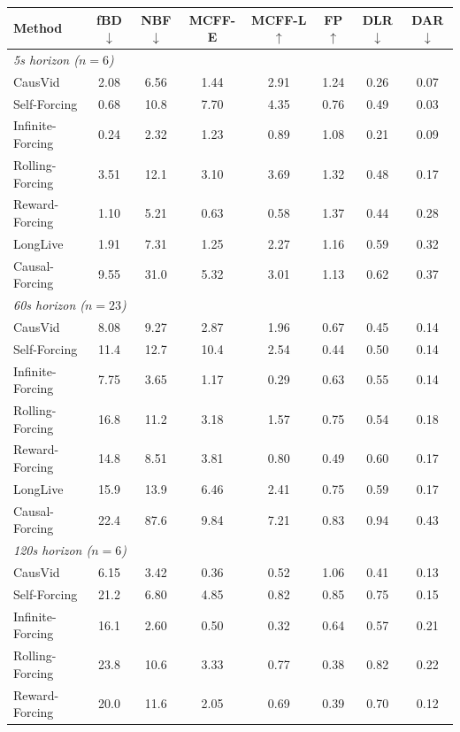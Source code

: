\begin{table}[!tb]
\centering
\small
\setlength{\tabcolsep}{4pt}
\begin{tabular}{lccccccc}
\toprule
Method & fBD$\downarrow$ & NBF$\downarrow$ & MCFF-E & MCFF-L$\uparrow$ & FP$\uparrow$ & DLR$\downarrow$ & DAR$\downarrow$ \\
\midrule
\multicolumn{8}{l}{\textit{5s horizon  ($n=6$)}} \\
CausVid & 2.08 & 6.56 & 1.44 & 2.91 & 1.24 & 0.26 & 0.07 \\
Self-Forcing & 0.68 & 10.8 & 7.70 & 4.35 & 0.76 & 0.49 & 0.03 \\
Infinite-Forcing & 0.24 & 2.32 & 1.23 & 0.89 & 1.08 & 0.21 & 0.09 \\
Rolling-Forcing & 3.51 & 12.1 & 3.10 & 3.69 & 1.32 & 0.48 & 0.17 \\
Reward-Forcing & 1.10 & 5.21 & 0.63 & 0.58 & 1.37 & 0.44 & 0.28 \\
LongLive & 1.91 & 7.31 & 1.25 & 2.27 & 1.16 & 0.59 & 0.32 \\
Causal-Forcing & 9.55 & 31.0 & 5.32 & 3.01 & 1.13 & 0.62 & 0.37 \\
\midrule
\multicolumn{8}{l}{\textit{60s horizon  ($n=23$)}} \\
CausVid & 8.08 & 9.27 & 2.87 & 1.96 & 0.67 & 0.45 & 0.14 \\
Self-Forcing & 11.4 & 12.7 & 10.4 & 2.54 & 0.44 & 0.50 & 0.14 \\
Infinite-Forcing & 7.75 & 3.65 & 1.17 & 0.29 & 0.63 & 0.55 & 0.14 \\
Rolling-Forcing & 16.8 & 11.2 & 3.18 & 1.57 & 0.75 & 0.54 & 0.18 \\
Reward-Forcing & 14.8 & 8.51 & 3.81 & 0.80 & 0.49 & 0.60 & 0.17 \\
LongLive & 15.9 & 13.9 & 6.46 & 2.41 & 0.75 & 0.59 & 0.17 \\
Causal-Forcing & 22.4 & 87.6 & 9.84 & 7.21 & 0.83 & 0.94 & 0.43 \\
\midrule
\multicolumn{8}{l}{\textit{120s horizon  ($n=6$)}} \\
CausVid & 6.15 & 3.42 & 0.36 & 0.52 & 1.06 & 0.41 & 0.13 \\
Self-Forcing & 21.2 & 6.80 & 4.85 & 0.82 & 0.85 & 0.75 & 0.15 \\
Infinite-Forcing & 16.1 & 2.60 & 0.50 & 0.32 & 0.64 & 0.57 & 0.21 \\
Rolling-Forcing & 23.8 & 10.6 & 3.33 & 0.77 & 0.38 & 0.82 & 0.22 \\
Reward-Forcing & 20.0 & 11.6 & 2.05 & 0.69 & 0.39 & 0.70 & 0.12 \\

\end{tabular}
\end{table}
